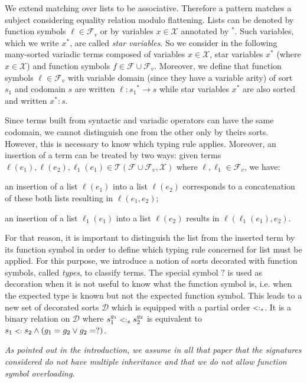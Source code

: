 \documentclass{eptcs}
\newcommand{\TT}{\ensuremath{\mathcal{T}}\xspace}
\newcommand{\XX}{\ensuremath{\mathcal{X}}\xspace}
\newcommand{\caD}{\ensuremath{\mathcal{D}}\xspace}
\newcommand{\caF}{\ensuremath{\mathcal{F}}\xspace}
\newcommand{\TFVX}{\ensuremath{\TT(\caF \cup \caF_v,\XX)}\xspace}
\newcommand{\sub}{\mathrel{\mbox{{\footnotesize $<:$}}}}
\newcommand{\vsig}[2]{\ensuremath{{#1}^*\rightarrow{#2}}}
\begin{document}
We extend matching over lists to be associative. Therefore a pattern matches a subject
considering equality relation modulo flattening. Lists can be denoted by function symbols
$\ell \in \caF_v$ or by variables $x \in \XX$ annotated by $^*$. Such variables, which we
write $x^*$, are called {\em star variables}. So we consider in the following many-sorted
variadic terms composed of variables $x\in\XX$, star variables $x^*$ (where $x \in \XX$)
and function symbols $f\in\caF\cup\caF_v$. Moreover, we define that function symbols $\ell
\in \caF_v$ with variable domain (since they have a variable arity) of sort $s_1$ and
codomain $s$ are written $\ell : \vsig{s_1}{s}$ while star variables $x^*$ are also sorted
and written $x^* : s$.

Since terms built from syntactic and variadic operators can have the same codomain, we
cannot distinguish one from the other only by theirs sorts. However, this is necessary to
know which typing rule applies. Moreover, an insertion of a term can be treated by two
ways: given terms $\ell(e_1),\ell(e_2),\ell_1(e_1) \in \TFVX$ where $\ell, \ell_1 \in
\caF_v$, we have:
\begin{inparaenum}[1)]
\item an insertion of a list $\ell(e_1)$ into a list $\ell(e_2)$ corresponds to a
concatenation of these both lists resulting in $\ell(e_1,e_2)$;
\item an insertion of a list $\ell_1(e_1)$ into a list $\ell(e_2)$ results in $\ell(\ell_1(e_1),e_2)$.
\end{inparaenum}
For that reason, it is important to distinguish the list from the inserted term by its
function symbol in order to define which typing rule concerned for list must be
applied. For this purpose, we introduce a notion of sorts decorated with function symbols,
called {\em types}, to classify terms. The special symbol $?$ is used as decoration when
it is not useful to know what the function symbol is, i.e. when the expected type is known
but not the expected function symbol. This leads to a new set of decorated sorts $\caD$
which is equipped with a partial order $\sub_s$. It is a binary relation on $\caD$ where
$s_1^{g_1} \sub_s s_2^{g_2}$ is equivalent to $s_1 \sub s_2 \wedge (g_1 = g_2 \vee
g_2 = ?)$.

\textit{As pointed out in the introduction, we assume in all that paper that the
  signatures considered do not have multiple inheritance and that we do not allow function
  symbol overloading.} 
\end{document}
